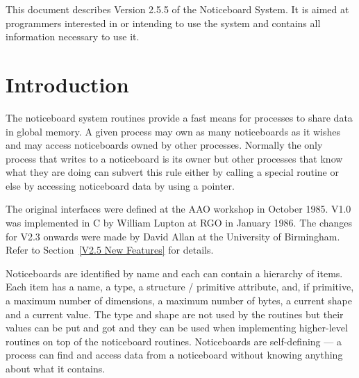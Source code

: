 \documentclass[twoside,11pt]{article}
\newcommand{\stardocinitials}  {SUN}
\newcommand{\stardocnumber}    {77.8}
\newcommand{\stardocabstract}  {This document describes Version 2.5.5 of the Noticeboard System. It
is aimed at programmers interested in or intending to use the system and
contains all information necessary to use it.
}
\newcommand{\stardocname}{\stardocinitials /\stardocnumber}
\newenvironment{latexonly}{}{}
\renewcommand{\_}{\texttt{\symbol{95}}}
\renewcommand{\thepage}{\roman{page}}
\begin{document}
\stardocabstract
  \newpage
  \begin{latexonly}
    \setlength{\parskip}{0mm}
    \tableofcontents
    \setlength{\parskip}{\medskipamount}
    \markboth{\stardocname}{\stardocname}
  \end{latexonly}
\cleardoublepage
\renewcommand{\thepage}{\arabic{page}}
\setcounter{page}{1}


\section {Introduction}



      The noticeboard system routines provide a fast means for processes to
      share data in global memory. A given process may own as many noticeboards
      as it wishes and may access noticeboards owned by other processes.
      Normally the only process that writes to a noticeboard is its owner but
      other processes that know what they are doing can subvert this rule
      either by calling a special routine or else by accessing noticeboard data
      by using a pointer.

      The original interfaces were defined at the {AAO} workshop in October
      1985. {V1.0} was implemented in C by William Lupton at {RGO} in January
      1986. The changes for {V2.3} onwards were made by David Allan at the University
      of Birmingham.
      Refer to Section~\ref{V2.5 New Features} for details.

      Noticeboards are identified by name and each can contain a hierarchy of
      items. Each item has a name, a type, a structure / primitive attribute,
      and, if primitive, a maximum number of dimensions, a maximum number of
      bytes, a current shape and a current value. The type and shape are not
      used by the routines but their values can be put and got and they can be
      used when implementing higher-level routines on top of the noticeboard
      routines. Noticeboards are self-defining --- a process can find and access
      data from a noticeboard without knowing anything about what it contains.
\end{document}
